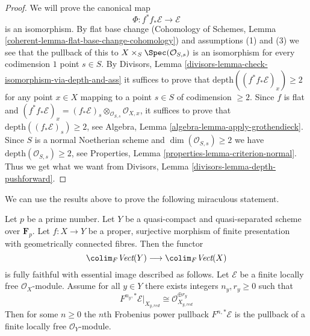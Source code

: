 \begin{proof}
We will prove the canonical map
$$
\Phi : f^*f_*\mathcal{E} \longrightarrow \mathcal{E}
$$
is an isomorphism. By flat base change (Cohomology of Schemes, Lemma
\ref{coherent-lemma-flat-base-change-cohomology})
and assumptions (1) and (3) we see that
the pullback of this to $X \times_S \Spec(\mathcal{O}_{S, s})$
is an isomorphism for every codimension $1$ point $s \in S$.
By Divisors, Lemma \ref{divisors-lemma-check-isomorphism-via-depth-and-ass}
it suffices to prove that $\text{depth}((f^*f_*\mathcal{E})_x) \geq 2$
for any point $x \in X$ mapping to a point $s \in S$ of codimension $\geq 2$.
Since $f$ is flat and
$(f^*f_*\mathcal{E})_x = (f_*\mathcal{E})_s \otimes_{\mathcal{O}_{S, s}}
\mathcal{O}_{X, x}$, it suffices to prove that
$\text{depth}((f_*\mathcal{E})_s) \geq 2$, see
Algebra, Lemma \ref{algebra-lemma-apply-grothendieck}.
Since $S$ is a normal Noetherian scheme
and $\dim(\mathcal{O}_{S, s}) \geq 2$
we have $\text{depth}(\mathcal{O}_{S, s}) \geq 2$, see
Properties, Lemma \ref{properties-lemma-criterion-normal}.
Thus we get what we want from
Divisors, Lemma \ref{divisors-lemma-depth-pushforward}.
\end{proof}

\noindent
We can use the results above to prove the following
miraculous statement.

\begin{theorem}
\label{theorem-pullback-trivial-fibres}
Let $p$ be a prime number. Let $Y$ be a quasi-compact and quasi-separated
scheme over $\mathbf{F}_p$.
Let $f : X \to Y$ be a proper, surjective morphism of finite presentation
with geometrically connected fibres.
Then the functor
$$
\colim_F \textit{Vect}(Y) \longrightarrow \colim_F \textit{Vect}(X)
$$
is fully faithful with essential image described as follows.
Let $\mathcal{E}$ be a finite locally free $\mathcal{O}_X$-module.
Assume for all $y \in Y$ there exists integers $n_y, r_y \geq 0$
such that
$$
F^{n_y, *}\mathcal{E}|_{X_{y, red}}
\cong
\mathcal{O}_{X_{y, red}}^{\oplus r_y}
$$
Then for some $n \geq 0$ the $n$th Frobenius power pullback
$F^{n, *}\mathcal{E}$ is the pullback of a finite locally free
$\mathcal{O}_Y$-module.
\end{theorem}

